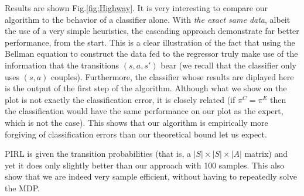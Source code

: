 \documentclass[smallextended]{svjour3}
\begin{document}
Results are shown Fig.\ref{fig:Highway}. It is very interesting to compare our algorithm to the behavior of a classifier alone. With \emph{the exact same data}, albeit the use of a very simple heuristics, the cascading approach demonstrate far better performance, from the start. This is a clear illustration of the fact that using the Bellman equation to construct the data fed to the regressor truly make use of the information that the transitions $(s,a,s')$ bear (we recall that the classifier only uses $(s,a)$ couples). Furthermore, the classifier whose results are diplayed here is the output of the first step of the algorithm. Although what we show on the plot is not exactly the classification error, it is closely related (if $\pi^C=\pi^E$ then the classification would have the same performance on our plot as the expert, which is not the case). This shows that our algorithm is empirically more forgiving of classification errors than our theoretical bound let us expect.

PIRL is given the transition probabilities (that is, a $|S|\times |S|\times |A|$ matrix) and yet it does only slightly better than our approach with 100 samples. This also show that we are indeed very sample efficient, without having to repeatedly solve the MDP.
\end{document}
